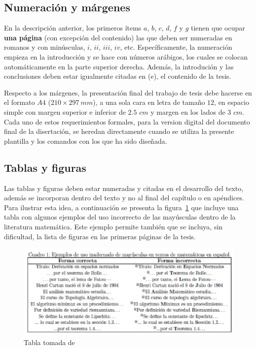 \subsection{Numeraci\'on y m\'argenes}%
En la descripci\'on anterior, los primeros \'items $a$, $b$, $c$, $d$, $f$ y $g$ tienen que ocupar \textbf{una p\'agina} (con excepci\'on del contenido) las que deben ser numeradas en romanos y con min\'usculas, $i$, $ii$, $iii$, $iv$, etc.
Espec\'ificamente, la numeraci\'on empieza en la introducci\'on y se hace con n\'umeros ar\'abigos, los cuales se colocan autom\'aticamente en la parte superior derecha.
Adem\'as, la introduci\'on  y las conclusiones deben estar igualmente citadas en (e), el contenido de la tesis.
\par
Respecto a los m\'argenes, la presentaci\'on final del trabajo de tesis debe hacerse en el formato $A4$ ($210\times297~mm$), a una sola cara en letra de tama\~{n}o $12$, en espacio simple con margen superior e inferior de $2.5$ $cm$ y margen en los lados de $3$ $cm$.
Cada uno de estos requerimientos formales, para la version digital del documento final de la disertaci\'on, se heredan directamente cuando se utiliza la presente plantilla y los comandos con los que ha sido dise\~{n}ada.
%
\subsection{Tablas y figuras}
Las tablas y figuras deben estar numeradas y citadas en el desarrollo del texto, adem\'as se incorporan dentro  del texto y no al final del cap\'itulo o en ap\'endices. Para ilustrar esta idea, a continuaci\'on se presenta la \mbox{figura \ref{gutu}} que incluye una tabla con algunos ejemplos del uso incorrecto de las may\'usculas dentro de la literatura matem\'atica.
Este ejemplo permite tambi\'en que se incluya, sin dificultad, la lista de figuras en las primeras p\'aginas de la tesis.
%
\begin{figure}[htb]
\begin{center}
  \includegraphics[width=14.5cm]{gutu.eps}
   \caption{Tabla tomada de \cite{MR3052697}}\label{gutu}
\end{center}
\end{figure}
%
